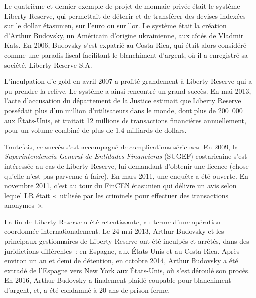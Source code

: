 Le quatrième et dernier exemple de projet de monnaie privée était le système Liberty Reserve, qui permettait de détenir et de transférer des devises indexées sur le dollar étasunien, sur l'euro ou sur l'or. Le système était la création d'Arthur Budovsky, un Américain d'origine ukrainienne, aux côtés de Vladmir Kats. En 2006, Budovsky s'est expatrié au Costa Rica, qui était alors considéré comme une paradis fiscal facilitant le blanchiment d'argent, où il a enregistré sa société, Liberty Reserve S.A.  %

L'inculpation d'e-gold en avril 2007 a profité grandement à Liberty Reserve qui a pu prendre la relève. Le système a ainsi rencontré un grand succès. En mai  2013, l'acte d'accusation du département de la Justice estimait que Liberty Reserve possédait plus d'un million d’utilisateurs dans le monde, dont plus de 200~000 aux États-Unis, et traitait 12 millions de transactions financières annuellement, pour un volume combiné de plus de 1,4 milliards de dollars.

Toutefois, ce succès s'est accompagné de complications sérieuses. En 2009, la \emph{Superintendencia General de Entidades Financieras} (SUGEF) costaricaine s'est intéressée au cas de Liberty Reserve, lui demandant d'obtenir une licence (chose qu'elle n'est pas parvenue à faire). En mars 2011, une enquête a été ouverte. En novembre 2011, c'est au tour du FinCEN étasunien qui délivre un avis selon lequel LR était «~utilisée par les criminels pour effectuer des transactions anonymes~».

La fin de Liberty Reserve a été retentissante, au terme d'une opération coordonnée internationalement. Le 24 mai 2013, Arthur Budovsky et les principaux gestionnaires de Liberty Reserve ont été inculpés et arrêtés, dans des juridictions différentes~: en Espagne, aux États-Unis et au Costa Rica. Après environ un an et demi de détention, en octobre 2014, Arthur Budovsky a été extradé de l'Espagne vers New York aux États-Unis, où s'est déroulé son procès. En 2016, Arthur Budovsky a finalement plaidé coupable pour blanchiment d'argent, et, a été condamné à 20 ans de prison ferme.

